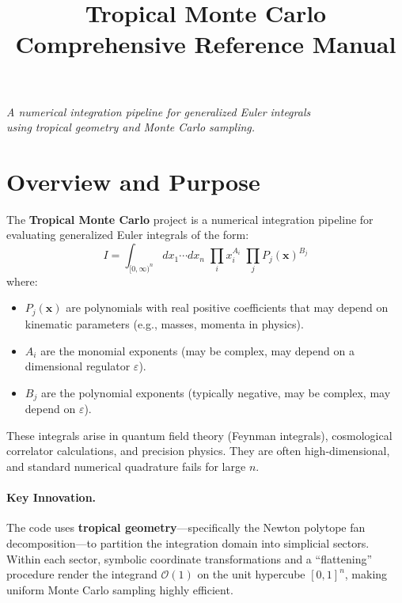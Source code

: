 \documentclass[11pt,a4paper]{article}
\title{\textbf{Tropical Monte Carlo} \\ \Large Comprehensive Reference Manual}
\author{}
\date{}
\begin{document}
\maketitle
\thispagestyle{empty}

\vfill
\begin{center}
\textit{A numerical integration pipeline for generalized Euler integrals \\
using tropical geometry and Monte Carlo sampling.}
\end{center}
\vfill

\newpage
\tableofcontents
\newpage

\section{Overview and Purpose}

The \textbf{Tropical Monte Carlo} project is a numerical integration pipeline for evaluating generalized Euler integrals of the form:
\begin{equation}\label{eq:main}
I = \int_{[0,\infty)^n} dx_1 \cdots dx_n \;\prod_{i} x_i^{A_i} \;\prod_{j} P_j(\mathbf{x})^{B_j}
\end{equation}
where:
\begin{itemize}
  \item $P_j(\mathbf{x})$ are polynomials with real positive coefficients that may depend on kinematic parameters (e.g., masses, momenta in physics).
  \item $A_i$ are the monomial exponents (may be complex, may depend on a dimensional regulator $\varepsilon$).
  \item $B_j$ are the polynomial exponents (typically negative, may be complex, may depend on $\varepsilon$).
\end{itemize}

These integrals arise in quantum field theory (Feynman integrals), cosmological correlator calculations, and precision physics. They are often high-dimensional, and standard numerical quadrature fails for large $n$.

\paragraph{Key Innovation.} The code uses \textbf{tropical geometry}---specifically the Newton polytope fan decomposition---to partition the integration domain into simplicial sectors. Within each sector, symbolic coordinate transformations and a ``flattening'' procedure render the integrand $\mathcal{O}(1)$ on the unit hypercube $[0,1]^n$, making uniform Monte Carlo sampling highly efficient.
\end{document}
